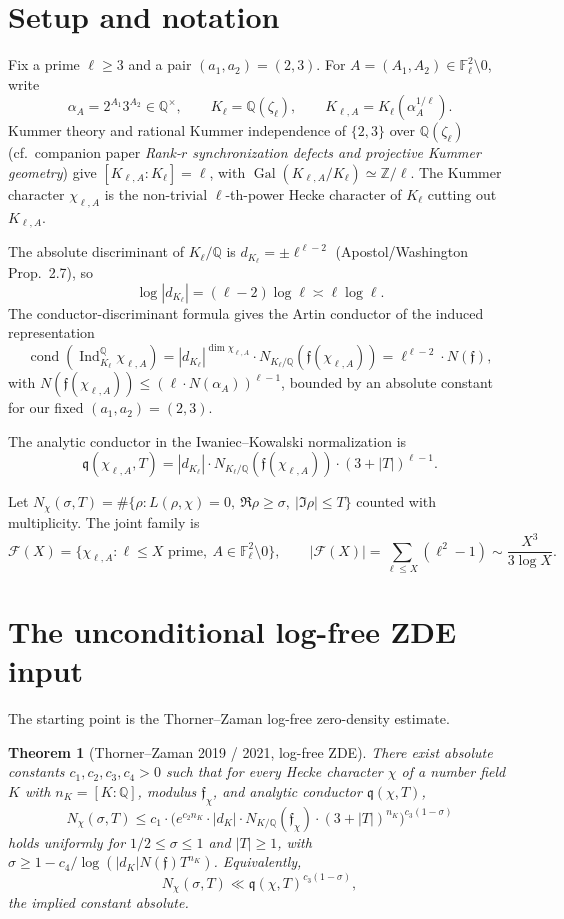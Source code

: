 \documentclass[11pt]{article}
\newtheorem{theorem}{Theorem}
\newcommand{\Z}{\mathbb Z}
\newcommand{\Q}{\mathbb Q}
\newcommand{\F}{\mathbb F}
\newcommand{\Gal}{\operatorname{Gal}}
\newcommand{\cond}{\operatorname{cond}}
\newcommand{\Ind}{\operatorname{Ind}}
\begin{document}
\section{Setup and notation}\label{S:setup}

Fix a prime $\ell\ge 3$ and a pair $(a_1,a_2)=(2,3)$.  For $A=(A_1,A_2)\in\F_\ell^2\setminus 0$, write
\[
\alpha_A=2^{A_1}3^{A_2}\in\Q^\times,
\qquad
K_\ell=\Q(\zeta_\ell),
\qquad
K_{\ell,A}=K_\ell(\alpha_A^{1/\ell}).
\]
Kummer theory and rational Kummer independence of $\{2,3\}$ over $\Q(\zeta_\ell)$ (cf.\ companion paper \emph{Rank-$r$ synchronization defects and projective Kummer geometry}) give $[K_{\ell,A}:K_\ell]=\ell$, with $\Gal(K_{\ell,A}/K_\ell)\simeq\Z/\ell$.  The Kummer character $\chi_{\ell,A}$ is the non-trivial $\ell$-th-power Hecke character of $K_\ell$ cutting out $K_{\ell,A}$.

The absolute discriminant of $K_\ell/\Q$ is $d_{K_\ell}=\pm\ell^{\ell-2}$ (Apostol/Washington Prop.~2.7), so
\[
\log|d_{K_\ell}|=(\ell-2)\log\ell\asymp\ell\log\ell.
\]
The conductor-discriminant formula gives the Artin conductor of the induced representation
\[
\cond(\Ind_{K_\ell}^{\Q}\chi_{\ell,A})=|d_{K_\ell}|^{\dim\chi_{\ell,A}}\cdot N_{K_\ell/\Q}(\mathfrak f(\chi_{\ell,A}))=\ell^{\ell-2}\cdot N(\mathfrak f),
\]
with $N(\mathfrak f(\chi_{\ell,A}))\le(\ell\cdot N(\alpha_A))^{\ell-1}$, bounded by an absolute constant for our fixed $(a_1,a_2)=(2,3)$.

The analytic conductor in the Iwaniec--Kowalski normalization is
\[
\mathfrak q(\chi_{\ell,A},T)=|d_{K_\ell}|\cdot N_{K_\ell/\Q}(\mathfrak f(\chi_{\ell,A}))\cdot(3+|T|)^{\ell-1}.
\]

Let $N_\chi(\sigma,T)=\#\{\rho:L(\rho,\chi)=0,\ \Re\rho\ge\sigma,\ |\Im\rho|\le T\}$ counted with multiplicity.  The joint family is
\[
\mathcal F(X)=\{\chi_{\ell,A}:\ell\le X\text{ prime},\ A\in\F_\ell^2\setminus 0\},
\qquad
|\mathcal F(X)|=\sum_{\ell\le X}(\ell^2-1)\sim\frac{X^3}{3\log X}.
\]

\section{The unconditional log-free ZDE input}\label{S:tz}

The starting point is the Thorner--Zaman log-free zero-density estimate.

\begin{theorem}[Thorner--Zaman 2019 / 2021, log-free ZDE]\label{T:TZ}
There exist absolute constants $c_1,c_2,c_3,c_4>0$ such that for every Hecke character $\chi$ of a number field $K$ with $n_K=[K:\Q]$, modulus $\mathfrak f_\chi$, and analytic conductor $\mathfrak q(\chi,T)$,
\[
N_\chi(\sigma,T)\le c_1\cdot\bigl(e^{c_2 n_K}\cdot|d_K|\cdot N_{K/\Q}(\mathfrak f_\chi)\cdot(3+|T|)^{n_K}\bigr)^{c_3(1-\sigma)}
\]
holds uniformly for $1/2\le\sigma\le 1$ and $|T|\ge 1$, with $\sigma\ge 1-c_4/\log(|d_K|N(\mathfrak f)T^{n_K})$.  Equivalently,
\[
N_\chi(\sigma,T)\ll\mathfrak q(\chi,T)^{c_3(1-\sigma)},
\]
the implied constant absolute.
\end{theorem}
\end{document}
